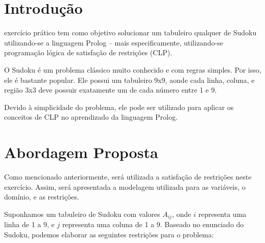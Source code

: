 \documentclass[journal,transmag]{IEEEtran}
\begin{document}
\section{Introdução}
%
%
%
%
 exercício prático tem como objetivo solucionar um
tabuleiro qualquer de Sudoku utilizando-se a linguagem Prolog -- mais
especificamente, utilizando-se programação lógica de satisfação de restrições
(CLP).

O Sudoku é um problema clássico muito conhecido e com regras simples. Por isso,
ele é bastante popular. Ele possui um tabuleiro 9x9, aonde cada linha, coluna, e
região 3x3 deve possuir exatamente um de cada número entre 1 e 9.

Devido à simplicidade do problema, ele pode ser utilizado para aplicar os
conceitos de CLP no aprendizado da linguagem Prolog.

\section{Abordagem Proposta}
Como mencionado anteriormente, será utilizada a satisfação de restrições neste
exercício. Assim, será apresentada a modelagem utilizada para as variáveis, o
domínio, e as restrições.

Suponhamos um tabuleiro de Sudoku com valores $A_{ij}$, onde $i$ representa uma
linha de 1 a 9, e $j$ representa uma coluna de 1 a 9. Baseado no enunciado do
Sudoku, podemos elaborar as seguintes restrições para o problema:
\end{document}
